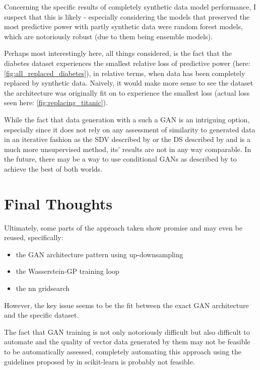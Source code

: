 Concerning the specific results of completely synthetic data model performance, I suspect that this is likely - especially considering the models that preserved the most predictive power with partly synthetic data were random forest models, which are notoriously robust (due to them being ensemble models).

Perhaps most interestingly here, all things considered, is the fact that the diabetes dataset experiences the smallest relative loss of predictive power (here: \ref{fig:all_replaced_diabetes}), in relative terms, when data has been completely replaced by synthetic data. Naively, it would make more sense to see the dataset the architecture was originally fit on to experience the smallest loss (actual loss seen here: \ref{fig:replacing_titanic}).

While the fact that data generation with a such a \ac{GAN} is an intriguing option, especially since it does not rely on any assessment of similarity to generated data in an iterative fashion as the \ac{SDV} described by \cite{patki2016synthetic} or the \ac{DS} described by \cite{ping2017datasynthesizer} and is a much more unsupervised method, its' results are not in any way comparable. In the future, there may be a way to use conditional \acp{GAN} as described by \cite{conditional_gans} to achieve the best of both worlds.

\pagebreak

\section{Final Thoughts}

Ultimately, some parts of the approach taken show promise and may even be reused, specifically:

\begin{itemize}
	\item the \ac{GAN} architecture pattern using up-downsampling
	\item the Wasserstein-GP training loop
	\item the \ac{nn} gridsearch
\end{itemize}

However, the key issue seems to be the fit between the exact \ac{GAN} architecture and the specific dataset.

The fact that \ac{GAN} training is not only notoriously difficult but also difficult to automate and the quality of vector data generated by them may not be feasible to be automatically assessed, completely automating this approach using the guidelines proposed by \cite{buitinck2013api} in scikit-learn is probably not feasible.

